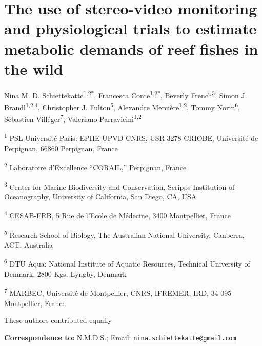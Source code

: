 \documentclass[
]{article}
\author{}
\date{\vspace{-2.5em}}
\begin{document}

\hypertarget{the-use-of-stereo-video-monitoring-and-physiological-trials-to-estimate-metabolic-demands-of-reef-fishes-in-the-wild}{%
\section{The use of stereo-video monitoring and physiological trials to
estimate metabolic demands of reef fishes in the
wild}\label{the-use-of-stereo-video-monitoring-and-physiological-trials-to-estimate-metabolic-demands-of-reef-fishes-in-the-wild}}

\noindent Nina M. D. Schiettekatte\textsuperscript{1,2*}, Francesca
Conte\textsuperscript{1,2*}, Beverly French\textsuperscript{3}, Simon J.
Brandl\textsuperscript{1,2,4}, Christopher J. Fulton\textsuperscript{5},
Alexandre Mercière\textsuperscript{1,2}, Tommy Norin\textsuperscript{6},
Sébastien Villéger\textsuperscript{7}, Valeriano
Parravicini\textsuperscript{1,2}

\singlespace \fontsize{10}{12}\selectfont

\noindent \textsuperscript{1} PSL Université Paris: EPHE-UPVD-CNRS, USR
3278 CRIOBE, Université de Perpignan, 66860 Perpignan, France

\noindent \textsuperscript{2} Laboratoire d'Excellence ``CORAIL,''
Perpignan, France

\noindent \textsuperscript{3} Center for Marine Biodiversity and
Conservation, Scripps Institution of Oceanography, University of
California, San Diego, CA, USA

\noindent \textsuperscript{4} CESAB-FRB, 5 Rue de l'Ecole de Médecine,
3400 Montpellier, France

\noindent \textsuperscript{5} Research School of Biology, The Australian
National University, Canberra, ACT, Australia

\noindent \textsuperscript{6} DTU Aqua: National Institute of Aquatic
Resources, Technical University of Denmark, 2800 Kgs. Lyngby, Denmark

\noindent \textsuperscript{7} MARBEC, Université de Montpellier, CNRS,
IFREMER, IRD, 34 095 Montpellier, France

\doublespace \fontsize{12}{14}\selectfont
\setlength{\parindent}{15pt}

\noindent * These authors contributed equally

\noindent \textbf{Correspondence to:} N.M.D.S.; Email:
\href{mailto:nina.schiettekatte@gmail.com}{\nolinkurl{nina.schiettekatte@gmail.com}}
\end{document}
